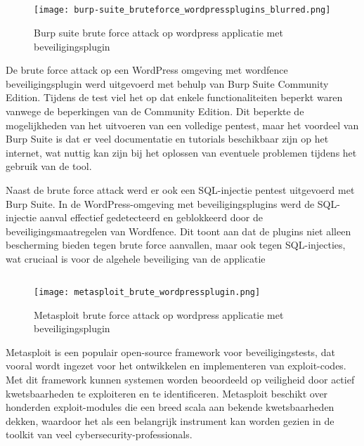 \subsection{}
\begin{figure}
    \centering
    \texttt{[image: burp-suite\_bruteforce\_wordpressplugins\_blurred.png]}
    \caption[Burp suite brute force attack op wordpress applicatie met beveiligingsplugin]{Burp suite brute force attack op wordpress applicatie met beveiligingsplugin}
\end{figure}
De brute force attack op een WordPress omgeving met wordfence beveiligingsplugin werd uitgevoerd met behulp van Burp Suite Community Edition. Tijdens de test viel het 
op dat enkele functionaliteiten beperkt waren vanwege de beperkingen van de Community Edition. Dit beperkte de mogelijkheden van het uitvoeren van een volledige 
pentest, maar het voordeel van Burp Suite is dat er veel documentatie en tutorials beschikbaar zijn op het internet, wat nuttig kan zijn bij het oplossen van 
eventuele problemen tijdens het gebruik van de tool.

Naast de brute force attack werd er ook een SQL-injectie pentest uitgevoerd met Burp Suite. In de WordPress-omgeving met beveiligingsplugins werd de SQL-injectie aanval 
effectief gedetecteerd en geblokkeerd door de beveiligingsmaatregelen van Wordfence. Dit toont aan dat de plugins niet alleen bescherming bieden tegen brute force 
aanvallen, maar ook tegen SQL-injecties, wat cruciaal is voor de algehele beveiliging van de applicatie

\subsection{}
\begin{figure}
    \centering
    \texttt{[image: metasploit\_brute\_wordpressplugin.png]}
    \caption[Metasploit brute force attack op wordpress applicatie met beveiligingsplugin]{Metasploit brute force attack op wordpress applicatie met beveiligingsplugin}
\end{figure}
Metasploit is een populair open-source framework voor beveiligingstests, dat vooral wordt ingezet voor het ontwikkelen en implementeren van exploit-codes. 
Met dit framework kunnen systemen worden beoordeeld op veiligheid door actief kwetsbaarheden te exploiteren en te identificeren. 
Metasploit beschikt over honderden exploit-modules die een breed scala aan bekende kwetsbaarheden dekken, waardoor het als een belangrijk 
instrument kan worden gezien in de toolkit van veel cybersecurity-professionals.

